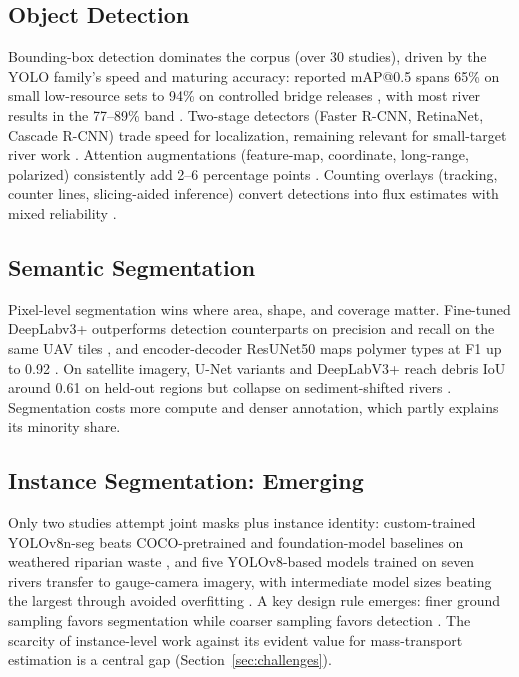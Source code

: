 \documentclass[12pt]{article}
\begin{document}
\subsection{Object Detection}
Bounding-box detection dominates the corpus (over 30 studies), driven by the YOLO family's speed and maturing accuracy: reported mAP@0.5 spans 65\% on small low-resource sets \cite{Putra2021} to 94\% on controlled bridge releases \cite{Reinhardt2024}, with most river results in the 77--89\% band \cite{Lin2021,Yang2022,Zailan2022,Nunkhaw2024}. Two-stage detectors (Faster R-CNN, RetinaNet, Cascade R-CNN) trade speed for localization, remaining relevant for small-target river work \cite{MPFasterRCNN2024,Cheng2021}. Attention augmentations (feature-map, coordinate, long-range, polarized) consistently add 2--6 percentage points \cite{Lin2021,Yang2022,Peng2024}. Counting overlays (tracking, counter lines, slicing-aided inference) convert detections into flux estimates with mixed reliability \cite{Putra2021,Lee2025,JiaFlux2025}.

\subsection{Semantic Segmentation}
Pixel-level segmentation wins where area, shape, and coverage matter. Fine-tuned DeepLabv3+ outperforms detection counterparts on precision and recall on the same UAV tiles \cite{Pati2025}, and encoder-decoder ResUNet50 maps polymer types at F1 up to 0.92 \cite{Jakovljevic2020}. On satellite imagery, U-Net variants and DeepLabV3+ reach debris IoU around 0.61 on held-out regions but collapse on sediment-shifted rivers \cite{SoleGomez2022}. Segmentation costs more compute and denser annotation, which partly explains its minority share.

\subsection{Instance Segmentation: Emerging}
Only two studies attempt joint masks plus instance identity: custom-trained YOLOv8n-seg beats COCO-pretrained and foundation-model baselines on weathered riparian waste \cite{Pan2024}, and five YOLOv8-based models trained on seven rivers transfer to gauge-camera imagery, with intermediate model sizes beating the largest through avoided overfitting \cite{Kataoka2024}. A key design rule emerges: finer ground sampling favors segmentation while coarser sampling favors detection \cite{Kataoka2024}. The scarcity of instance-level work against its evident value for mass-transport estimation is a central gap (Section~\ref{sec:challenges}).
\end{document}

